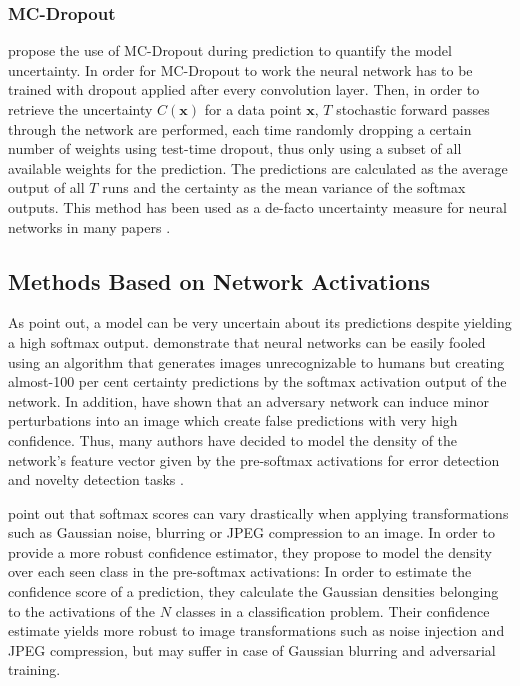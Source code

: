 \documentclass[10pt]{article}
\begin{document}
\subsubsection{MC-Dropout}
\textcite{ghahramani} propose the use of \gls{MC-Dropout} during prediction to quantify the model uncertainty. In order for \gls{MC-Dropout} to work the neural network has to be trained with dropout applied after every convolution layer. Then, in order to retrieve the uncertainty $C(\mathbf{x})$ for a data point $\mathbf{x}$,  $T$ stochastic forward passes through the network are performed, each time randomly dropping a certain number of weights using test-time dropout, thus only using a subset of all available weights for the prediction. The predictions are calculated as the average output of all $T$ runs and the certainty as the mean variance of the softmax outputs. This method has been used as a de-facto uncertainty measure for neural networks in many papers \cite{mandelbaum17, leibig2017, Lakshminarayanan16, subramanya, Kampffmeyer2016SemanticSO}.

\subsection{Methods Based on Network Activations}
\label{subsec:pre-softmax}
As \textcite{ghahramani} point out, a model can be very uncertain about its predictions despite yielding a high softmax output. \textcite{NguyenYC14} demonstrate that neural networks can be easily fooled using an algorithm that generates images unrecognizable to humans but creating almost-100 per cent certainty predictions by the softmax activation output of the network. In addition, \textcite{Goodfellow2014} have shown that an adversary network can induce minor perturbations into an image which create false predictions with very high confidence. Thus, many authors have decided to model the density of the network's feature vector given by the pre-softmax activations for error detection and novelty detection tasks \cite{subramanya, mandelbaum17, Bishop1994NoveltyDA}.

\textcite{subramanya} point out that softmax scores can vary drastically when applying transformations such as Gaussian noise, blurring or JPEG compression to an image. In order to provide a more robust confidence estimator, they propose to model the density over each seen class in the pre-softmax activations: In order to estimate the confidence score of a prediction, they calculate the Gaussian densities belonging to the activations of the $N$ classes in a classification problem. Their confidence estimate yields more robust to image transformations such as noise injection and JPEG compression, but may suffer in case of Gaussian blurring and adversarial training.
\end{document}
